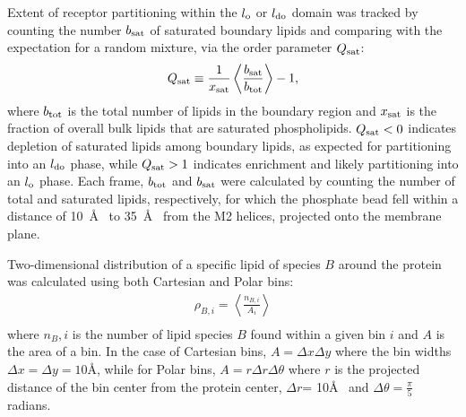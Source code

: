 Extent of receptor partitioning within the $l_{\mathrm{o}}$ or $l_{\mathrm{do}}$ domain was tracked by counting the number $b_{\mathrm{sat}}$ of saturated boundary lipids and comparing with the expectation for a random mixture, via the order parameter $Q_{\mathrm{sat}}$:
  \begin{equation}
    \begin{aligned}
      Q_{\mathrm{sat}}\equiv \frac{1}{x_{\mathrm{sat}}}\left\langle\frac{  b_{\mathrm{sat}} }{b_{\mathrm{tot}} }\right\rangle-1,\\
    \end{aligned}
    \label{eq:Q}
  \end{equation}
  where $b_{\mathrm{tot}}$ is the total number of lipids in the boundary region and $x_{\mathrm{sat}}$ is the fraction of overall bulk lipids that are saturated phospholipids. $Q_{\mathrm{sat}} <0$ indicates depletion of saturated lipids among boundary lipids, as expected for partitioning into an $l_{\mathrm{do}}$ phase, while $Q_{\mathrm{sat}}>1$ indicates enrichment and likely partitioning into an $l_{\mathrm{o}}$ phase. Each frame, $b_{\mathrm{tot}}$ and $b_{\mathrm{sat}}$ were calculated by counting the number of total and saturated lipids, respectively, for which the phosphate bead fell within a distance of 10~\AA~ to 35~\AA~ from the M2 helices, projected onto the membrane plane. 
  
  Two-dimensional distribution of a specific lipid of species $B$ around the protein was calculated using both Cartesian and Polar bins: %
  \begin{equation}
    \begin{aligned}
      \rho_{B,i}=\left\langle \frac{n_{B,i}}{A_{i}}\right\rangle \\        
    \end{aligned}
    \label{eq:R}
  \end{equation}
  where $n_B,i$ is the number of lipid species $B$ found within a given bin $i$ and $A$ is the area of a bin. In the case of Cartesian bins, $A = \Delta{x} \Delta{y}$ where the bin widths $\Delta{x} = \Delta{y} = 10$\AA, while for Polar bins, $A = r \Delta{r}\Delta{\theta}$ where $r$ is the projected distance of the bin center from the protein center, $\Delta{r}$= 10\AA~ and $\Delta{\theta} = \frac{\pi}{5}$ radians.
  
